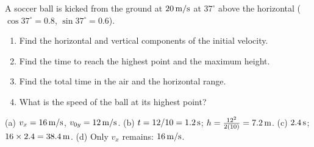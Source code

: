 \begin{exo}{}
A soccer ball is kicked from the ground at $20\,\mathrm{m/s}$ at $37^\circ$ above the horizontal ($\cos37^\circ=0.8$, $\sin37^\circ=0.6$).
\begin{enumerate}[label=(\alph*)]
\item Find the horizontal and vertical components of the initial velocity.
\item Find the time to reach the highest point and the maximum height.
\item Find the total time in the air and the horizontal range.
\item What is the speed of the ball at its highest point?
\end{enumerate}
\work{5cm}
\begin{solution}
(a) $v_x=16\,\mathrm{m/s}$, $v_{0y}=12\,\mathrm{m/s}$. \;(b) $t=12/10=1.2\,\mathrm{s}$; $h=\frac{12^2}{2(10)}=7.2\,\mathrm{m}$. \;(c) $2.4\,\mathrm{s}$; $16\times2.4=38.4\,\mathrm{m}$. \;(d) Only $v_x$ remains: $16\,\mathrm{m/s}$.
\end{solution}
\end{exo}

